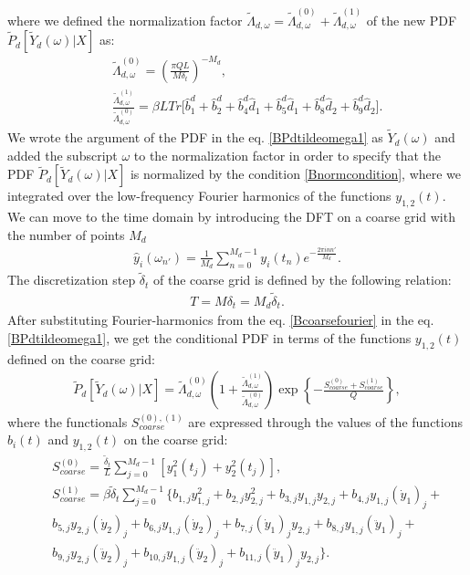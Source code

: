 \documentclass{article}
\begin{document}
where we defined the normalization factor $\tilde{\Lambda}_{d,\omega} = \tilde{\Lambda}_{d,\omega}^{(0)}+\tilde{\Lambda}_{d,\omega}^{(1)}$ of the new PDF $\tilde{P}_{d}[\tilde{Y}_{d}(\omega)|X]$ as: 
\begin{eqnarray}
    &&\tilde{\Lambda}_{d,\omega}^{(0)} = \left(\frac{\pi Q L}{M \delta_{t}}\right)^{-M_{d}},\label{BLambdad0omega} \\ &&\frac{\tilde{\Lambda}_{d,\omega}^{(1)}}{\tilde{\Lambda}_{d,\omega}^{(0)}} = \beta LTr\Big[\hat{b}_{1}^{d} + \hat{b}_{2}^{d} + \hat{b}_{4}^{d} \hat{d}_{1}  + \hat{b}_{5}^{d} \hat{d}_{1} +
    \hat{b}_{8}^{d} \hat{d}_{2} + \hat{b}_{9}^{d} \hat{d}_{2} \Big]. \label{BLambdad1omega}
\end{eqnarray}
We wrote the argument of the PDF in the eq. \eqref{BPdtildeomega1} as $\tilde{Y}_{d}(\omega)$ and added the subscript $\omega$ to the normalization factor in order to specify that the PDF $\tilde{P}_{d}[\tilde{Y}_{d}(\omega)|X]$ is normalized by the condition \eqref{Bnormcondition}, where we integrated over the low-frequency Fourier harmonics of the functions $y_{1,2}(t)$. We can move to the time domain by introducing the DFT on a coarse grid with the number of points $M_{d}$
\begin{eqnarray}\label{Bcoarsefourier}
    \hat{y}_{i}(\omega_{n'}) = \frac{1}{M_{d}}\sum_{n=0}^{M_{d}-1} y_{i}(t_{n})e^{-\frac{2\pi i n n'}{M_{d}}}.
\end{eqnarray}
The discretization step $\tilde{\delta}_{t}$ of the coarse grid is defined by the following relation: 
\begin{eqnarray}
    T = M\delta_{t} = M_{d}\tilde{\delta}_{t}.
\end{eqnarray}
After substituting Fourier-harmonics from the eq$.$ \eqref{Bcoarsefourier} in the eq$.$ \eqref{BPdtildeomega1}, we get the conditional PDF in terms of the functions $y_{1,2}(t)$ defined on the coarse grid:
\begin{eqnarray}\label{BtildePDFshort}
    \tilde{P}_{d}[\tilde{Y}_{d}(\omega)|X] = \tilde{\Lambda}_{d,\omega}^{(0)}\left(1 + \frac{\tilde{\Lambda}_{d,\omega}^{(1)}}{\tilde{\Lambda}_{d,\omega}^{(0)}}\right)\exp\left\{-\frac{S_{coarse}^{(0)} + S_{coarse}^{(1)}}{Q}\right\},
\end{eqnarray}
where the functionals $S_{coarse}^{(0),(1)}$ are expressed through the values of the functions $b_{i}(t)$ and $y_{1,2}(t)$ on the coarse grid:
\begin{eqnarray}
    &&S_{coarse}^{(0)} = \frac{\tilde{\delta}_{t}}{L}\sum_{j=0}^{M_{d}-1} \left[y_{1}^{2}(t_{j}) + y_{2}^{2}(t_{j})\right], \label{BS_0coarse}\\
    &&S_{coarse}^{(1)} = \beta \tilde{\delta}_{t} \sum_{j=0}^{M_{d}-1} \{b_{1,j}y_{1,j}^{2} + b_{2,j}y_{2,j}^{2} + b_{3,j}y_{1,j}y_{2,j} + b_{4,j}y_{1,j}(\dot{y}_{1})_{j}  + \nonumber\\
    && b_{5,j}y_{2,j}(\dot{y}_{2})_{j} +b_{6,j}y_{1,j}(\dot{y}_{2})_{j} + b_{7,j}(\dot{y}_{1})_{j}y_{2,j} + b_{8,j}y_{1,j}(\ddot{y}_{1})_{j}+ \nonumber\\
    && b_{9,j}y_{2,j}(\ddot{y}_{2})_{j} + b_{10,j}y_{1,j}(\ddot{y}_{2})_{j} + b_{11,j}(\ddot{y}_{1})_{j}y_{2,j}\}.\label{BS_1coarse}
\end{eqnarray} 
\end{document}
